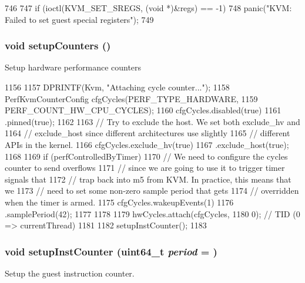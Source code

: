 \begin{DoxyCode}
746 {
747     if (ioctl(KVM_SET_SREGS, (void *)&regs) == -1)
748         panic("KVM: Failed to set guest special registers\n");
749 }
\end{DoxyCode}
\hypertarget{classBaseKvmCPU_a9a2709df130ee7a63e53f9d65a0ebb36}{
\subsubsection[{setupCounters}]{\setlength{\rightskip}{0pt plus 5cm}void setupCounters ()}}
\label{classBaseKvmCPU_a9a2709df130ee7a63e53f9d65a0ebb36}
Setup hardware performance counters 


\begin{DoxyCode}
1156 {
1157     DPRINTF(Kvm, "Attaching cycle counter...\n");
1158     PerfKvmCounterConfig cfgCycles(PERF_TYPE_HARDWARE,
1159                                 PERF_COUNT_HW_CPU_CYCLES);
1160     cfgCycles.disabled(true)
1161         .pinned(true);
1162 
1163     // Try to exclude the host. We set both exclude_hv and
1164     // exclude_host since different architectures use slightly
1165     // different APIs in the kernel.
1166     cfgCycles.exclude_hv(true)
1167         .exclude_host(true);
1168 
1169     if (perfControlledByTimer) {
1170         // We need to configure the cycles counter to send overflows
1171         // since we are going to use it to trigger timer signals that
1172         // trap back into m5 from KVM. In practice, this means that we
1173         // need to set some non-zero sample period that gets
1174         // overridden when the timer is armed.
1175         cfgCycles.wakeupEvents(1)
1176             .samplePeriod(42);
1177     }
1178 
1179     hwCycles.attach(cfgCycles,
1180                     0); // TID (0 => currentThread)
1181 
1182     setupInstCounter();
1183 }
\end{DoxyCode}
\hypertarget{classBaseKvmCPU_a807cad1db3257b823ffdb698c1e62a9a}{
\subsubsection[{setupInstCounter}]{\setlength{\rightskip}{0pt plus 5cm}void setupInstCounter (uint64\_\-t {\em period} = {})}}
\label{classBaseKvmCPU_a807cad1db3257b823ffdb698c1e62a9a}
Setup the guest instruction counter.

